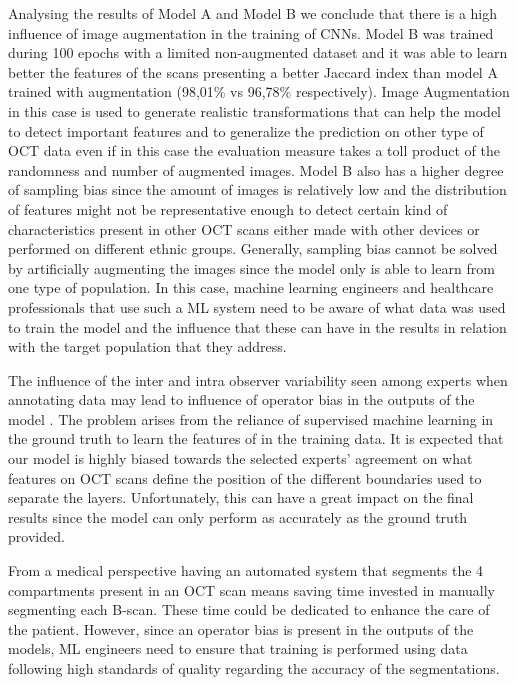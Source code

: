 \documentclass[12pt,a4paper]{scrartcl}
\begin{document}
Analysing the results of Model A and Model B we conclude that there is a high influence of image augmentation in the training of CNNs. Model B was trained during 100 epochs with a limited non-augmented dataset and it was able to learn better the features of the scans presenting a better Jaccard index than model A trained with augmentation (98,01\% vs 96,78\% respectively). Image Augmentation in this case is used to generate realistic transformations that can help the model to detect important features and to generalize the prediction on other type of OCT data even if in this case the evaluation measure takes a toll product of the randomness and number of augmented images. Model B also has a higher degree of sampling bias since the amount of images is relatively low and the distribution of features might not be representative enough to detect certain kind of characteristics present in other OCT scans either made with other devices or performed on different ethnic groups. Generally, sampling bias cannot be solved by artificially augmenting the images since the model only is able to learn from one type of population. In this case, machine learning engineers and healthcare professionals that use such a ML system need to be aware of what data was used to train the model and the influence that these can have in the results in relation with the target population that they address.


The influence of the inter and intra observer variability seen among experts when annotating data \cite{Maloca2019, Maloca2021, Ronchetti2019} may lead to 
influence of operator bias in the outputs of the model \cite{Gabr2016}. The problem arises from the reliance of supervised machine learning in the ground truth to learn the features of in the training data. It is expected that our model is highly biased towards the selected experts' agreement on what features on OCT scans define the position of the different boundaries used to separate the layers. Unfortunately, this can have a great impact on the final results since the model can only perform as accurately as the ground truth provided. 

From a medical perspective having an automated system that segments the 4 compartments present in an OCT scan means saving time invested in manually segmenting each B-scan. These time could be dedicated to enhance the care of the patient. However, since an operator bias is present in the outputs of the models, ML engineers need to ensure that training is performed using data following high standards of quality regarding the accuracy of the segmentations.
\end{document}
